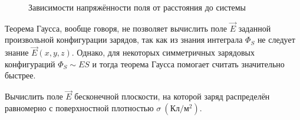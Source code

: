     \begin{figure}[b]
        \center
        \caption{Зависимости напряжённости поля от расстояния до системы}
    \end{figure}
    
    Теорема Гаусса, вообще говоря, не позволяет вычислить поле \( \vec{E} \) 
    заданной произвольной конфигурации зарядов, так как из знания интеграла 
    \( \Phi_S \) не следует знание \( \vec{E}(x,y,z) \). Однако, для некоторых 
    симметричных зарядовых конфигураций \( \Phi_S \sim ES \) и тогда теорема 
    Гаусса помогает считать значительно быстрее. 

    \begin{example}
        Вычислить поле \(\vec{E}\) бесконечной плоскости, на которой заряд 
        распределён равномерно с поверхностной плотностью
        \( \sigma\ (\text{Кл}/\text{м}^2) \).
    \end{example}


